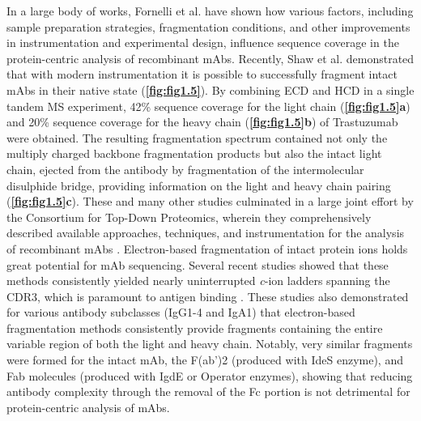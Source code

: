 In a large body of works, Fornelli et al. \cite{fornelli2012analysis, fornelli2014middle-down, fornelli2017top-down, fornelli2018accurate} have shown how various factors, including sample preparation strategies, fragmentation conditions, and other improvements in instrumentation and experimental design, influence sequence coverage in the protein-centric analysis of recombinant mAbs. Recently, Shaw et al. \cite{shaw2020direct} demonstrated that with modern instrumentation it is possible to successfully fragment intact mAbs in their native state (\textbf{\autoref{fig:fig1.5}}). By combining ECD and HCD in a single tandem MS experiment, 42\% sequence coverage for the light chain (\textbf{\autoref{fig:fig1.5}a}) and 20\% sequence coverage for the heavy chain (\textbf{\autoref{fig:fig1.5}b}) of Trastuzumab were obtained. The resulting fragmentation spectrum contained not only the multiply charged backbone fragmentation products but also the intact light chain, ejected from the antibody by fragmentation of the intermolecular disulphide bridge, providing information on the light and heavy chain pairing (\textbf{\autoref{fig:fig1.5}c}). These and many other studies culminated in a large joint effort by the Consortium for Top-Down Proteomics, wherein they comprehensively described available approaches, techniques, and instrumentation for the analysis of recombinant mAbs \cite{srzentić2020interlaboratory}.
Electron-based fragmentation of intact protein ions holds great potential for mAb sequencing. Several recent studies showed that these methods consistently yielded nearly uninterrupted \emph{c}-ion ladders spanning the CDR3, which is paramount to antigen binding \cite{boer2020selectivity, greisch2021generating, bondt2021human, shaw2018sequencing, shaw2020direct}. These studies also demonstrated for various antibody subclasses (IgG1-4 and IgA1) that electron-based fragmentation methods consistently provide fragments containing the entire variable region of both the light and heavy chain. Notably, very similar fragments were formed for the intact mAb, the F(ab’)2 (produced with IdeS enzyme), and Fab molecules (produced with IgdE or Operator enzymes), showing that reducing antibody complexity through the removal of the Fc portion is not detrimental for protein-centric analysis of mAbs.
